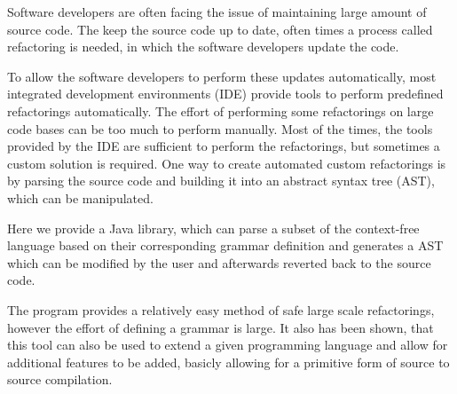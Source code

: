
Software developers are often facing the issue of maintaining large amount of source code. 
The keep the source code up to date, often times a process called refactoring is needed, in which the software developers update the code.

To allow the software developers to perform these updates automatically, most integrated development environments (IDE) provide tools to 
perform predefined refactorings automatically. 
The effort of performing some refactorings on large code bases can be too much to perform manually. 
Most of the times, the tools provided by the IDE are sufficient to perform the refactorings, but sometimes a custom solution is required.
One way to create automated custom refactorings is by parsing the source code and building it into an abstract syntax tree (AST), 
which can be manipulated.


Here we provide a Java library, which can parse a subset of the context-free language based on their corresponding grammar definition 
and generates a AST which can be modified by the user and afterwards reverted back to the source code.


The program provides a relatively easy method of safe large scale refactorings, however the effort of defining a grammar is large.
It also has been shown, that this tool can also be used to extend a given programming language and allow for additional features to be added, 
basicly allowing for a primitive form of source to source compilation. 
